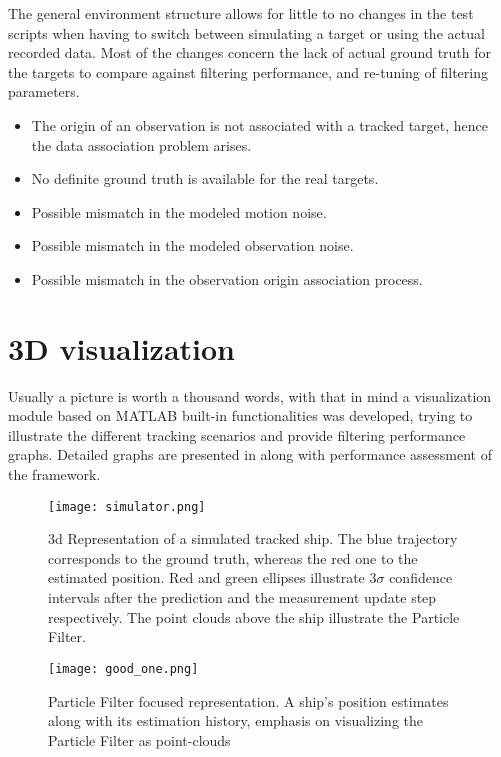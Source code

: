 The general environment structure allows for little to no changes in the test scripts when having to switch between simulating a target or using the actual recorded data. Most of the changes concern the lack of actual ground truth for the targets to compare against filtering performance, and re-tuning of filtering parameters.
\begin{itemize}
	\item  The origin of an observation is not associated with a tracked target, hence the data association problem arises.
	\item No definite ground truth is available for the real targets.
	\item Possible mismatch in the modeled motion noise.
	\item Possible mismatch in the modeled observation noise.
	\item Possible mismatch in the observation origin association process.
\end{itemize}

\section{3D visualization}

Usually a picture is worth a thousand words, with that in mind a visualization module based on MATLAB built-in functionalities was developed, trying to illustrate the different tracking scenarios and provide filtering performance graphs. Detailed graphs are presented in  along with performance assessment of the framework.

\begin{figure}[H]
	\centering
	\texttt{[image: simulator.png]}
	\caption{3d Representation of a simulated tracked ship. The blue trajectory corresponds to the ground truth, whereas the red one  to the estimated position. Red and green ellipses illustrate $3\sigma$ confidence intervals after the prediction and the measurement update step respectively. The point clouds above the ship illustrate the Particle Filter.}
	\label{fig:simulator1}
\end{figure}

\begin{figure}[H]
	\centering
	\texttt{[image: good\_one.png]}
		\caption{Particle Filter focused representation. A ship's position estimates along with its estimation history, emphasis on visualizing the Particle Filter as  point-clouds}	\label{fig:simulator2}
\end{figure}


